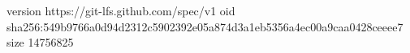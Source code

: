 version https://git-lfs.github.com/spec/v1
oid sha256:549b9766a0d94d2312c5902392e05a874d3a1eb5356a4ec00a9caa0428ceeee7
size 14756825
